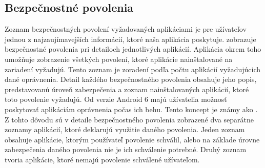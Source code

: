 \subsection{Bezpečnostné povolenia}
Zoznam bezpečnostných povolení vyžadovaných aplikáciami je pre užívateľov jednou z najzaujímavejších informácií, ktoré naša aplikácia poskytuje.  zobrazuje bezpečnostné povolenia pri detailoch jednotlivých aplikácií. Aplikácia okrem toho umožňuje zobrazenie všetkých povolení, ktoré aplikácie nainštalované na zariadení vyžadujú. Tento zoznam je zoradení podľa počtu aplikácií vyžadujúcich dané oprávnenia. Detail každého bezpečnostného povolenia obsahuje jeho popis, predstavovanú úroveň zabezpečenia a zoznam nainštalovaných aplikácií, ktoré toto povolenie vyžadujú. Od verzie Android 6 majú užívatelia možnosť poskytovať aplikáciám oprávnenia počas ich behu. Tento koncept je známy ako . Z tohto dôvodu sú v detaile bezpečnostného povolenia zobrazené dva separátne zoznamy aplikácií, ktoré deklarujú využitie daného povolenia. Jeden zoznam obsahuje aplikácie, ktorým používateľ povolenie schválil, alebo na základe úrovne zabezpečenia daného povolenia nie je ich schválenie potrebné. Druhý zoznam tvoria aplikácie, ktoré nemajú povolenie schválené užívateľom.

